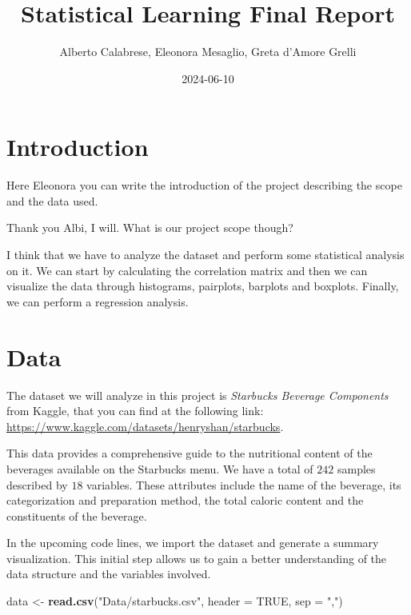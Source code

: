 \documentclass[
]{article}
\title{Statistical Learning Final Report}
\author{Alberto Calabrese, Eleonora Mesaglio, Greta d'Amore Grelli}
\date{2024-06-10}
\newenvironment{Shaded}{\begin{snugshade}}{\end{snugshade}}
\newcommand{\AttributeTok}[1]{\textcolor[rgb]{0.13,0.29,0.53}{#1}}
\newcommand{\ConstantTok}[1]{\textcolor[rgb]{0.56,0.35,0.01}{#1}}
\newcommand{\FunctionTok}[1]{\textcolor[rgb]{0.13,0.29,0.53}{\textbf{#1}}}
\newcommand{\NormalTok}[1]{#1}
\newcommand{\OtherTok}[1]{\textcolor[rgb]{0.56,0.35,0.01}{#1}}
\newcommand{\StringTok}[1]{\textcolor[rgb]{0.31,0.60,0.02}{#1}}
\begin{document}
\maketitle

{
\setcounter{tocdepth}{3}
\tableofcontents
}
\section{Introduction}\label{introduction}

Here Eleonora you can write the introduction of the project describing
the scope and the data used.

Thank you Albi, I will. What is our project scope though?

I think that we have to analyze the dataset and perform some statistical
analysis on it. We can start by calculating the correlation matrix and
then we can visualize the data through histograms, pairplots, barplots
and boxplots. Finally, we can perform a regression analysis.

\section{Data}\label{data}

The dataset we will analyze in this project is \emph{Starbucks Beverage
Components} from Kaggle, that you can find at the following link:
\url{https://www.kaggle.com/datasets/henryshan/starbucks}.

This data provides a comprehensive guide to the nutritional content of
the beverages available on the Starbucks menu. We have a total of
\(242\) samples described by \(18\) variables. These attributes include
the name of the beverage, its categorization and preparation method, the
total caloric content and the constituents of the beverage.

In the upcoming code lines, we import the dataset and generate a summary
visualization. This initial step allows us to gain a better
understanding of the data structure and the variables involved.

\begin{Shaded}
\begin{Highlighting}[]
\NormalTok{data }\OtherTok{\textless{}{-}} \FunctionTok{read.csv}\NormalTok{(}\StringTok{"Data/starbucks.csv"}\NormalTok{, }\AttributeTok{header =} \ConstantTok{TRUE}\NormalTok{, }\AttributeTok{sep =} \StringTok{","}\NormalTok{)}
\end{Highlighting}
\end{Shaded}
\end{document}
